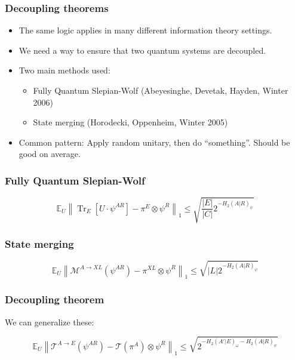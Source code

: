 \documentclass[12pt]{beamer}
\DeclareMathOperator{\tr}{\mathrm{Tr}}
\newcommand{\mbE}{\mathbb{E}}
\begin{document}
\begin{frame}
\frametitle{Decoupling theorems}
\begin{itemize}
\item The same logic applies in many different information theory settings.
\item We need a way to ensure that two quantum systems are decoupled.
\item Two main methods used:
\begin{itemize}
\item Fully Quantum Slepian-Wolf (Abeyesinghe, Devetak, Hayden, Winter 2006)
\item State merging (Horodecki, Oppenheim, Winter 2005)
\end{itemize}
\item Common pattern: Apply random unitary, then do ``something''. Should be good on average.
\end{itemize}
\end{frame}

\begin{frame}
\frametitle{Fully Quantum Slepian-Wolf}
    \begin{figure}
    \scalebox{1.0}{}
    \end{figure}
    \[ \mbE_{U} \left\| \tr_{E}[U \cdot \psi^{AR}] - \pi^E \otimes \psi^R \right\|_1 \leqslant \sqrt{\frac{|E|}{|C|} 2^{-H_2(A|R)_{\psi}}} \]
\end{frame}

\begin{frame}
\frametitle{State merging}
\begin{figure}
    \begin{figure}
    \scalebox{1.0}{}
    \end{figure}
\[ \mbE_U \left\| \mathcal{M}^{A \rightarrow XL}(\psi^{AR}) - \pi^{XL} \otimes \psi^R \right\|_1 \leqslant \sqrt{|L| 2^{-H_2(A|R)_{\psi}}} \]
\end{figure}
\end{frame}

\begin{frame}
\frametitle{Decoupling theorem}
We can generalize these:
    \begin{figure}
    \scalebox{0.9}{}
    \end{figure}
\[ \mbE_U \left\| \mathcal{T}^{A \rightarrow E}(\psi^{AR}) - \mathcal{T}(\pi^A) \otimes \psi^R \right\|_1 \leqslant \sqrt{2^{-H_2(A'|E)_{\omega} -H_2(A|R)_{\psi}}} \]
\end{frame}
\end{document}
